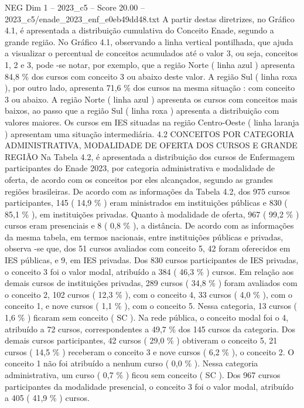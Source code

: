 \begin{textsample}{NEG Dim 1 – 2023\_c5 – Score 20.00 – 2023\_c5/enade\_2023\_enf\_e0eb49dd48.txt}
A partir destas diretrizes, no Gráfico 4.1, é apresentada a distribuição cumulativa do Conceito Enade, segundo a grande região.
No Gráfico 4.1, observando a linha vertical pontilhada, que ajuda a visualizar o percentual de conceitos acumulados até o valor 3, ou seja, conceitos 1, 2 e 3, pode -se notar, por exemplo, que a região Norte ( linha azul ) apresenta 84,8 \% dos cursos com conceito 3 ou abaixo deste valor.
A região Sul ( linha roxa ), por outro lado, apresenta 71,6 \% dos cursos na mesma situação : com conceito 3 ou abaixo.
A região Norte ( linha azul ) apresenta os cursos com conceitos mais baixos, ao passo que a região Sul ( linha roxa ) apresenta a distribuição com valores maiores.
Os cursos em IES situadas na região Centro-Oeste ( linha laranja ) apresentam uma situação intermediária. 4.2 CONCEITOS POR CATEGORIA ADMINISTRATIVA, MODALIDADE DE OFERTA DOS CURSOS E GRANDE REGIÃO Na Tabela 4.2, é apresentada a distribuição dos cursos de Enfermagem participantes do Enade 2023, por categoria administrativa e modalidade de oferta, de acordo com os conceitos por eles alcançados, segundo as grandes regiões brasileiras.
De acordo com as informações da Tabela 4.2, dos 975 cursos participantes, 145 ( 14,9 \% ) eram ministrados em instituições públicas e 830 ( 85,1 \% ), em instituições privadas.
Quanto à modalidade de oferta, 967 ( 99,2 \% ) cursos eram presenciais e 8 ( 0,8 \% ), a distância.
De acordo com as informações da mesma tabela, em termos nacionais, entre instituições públicas e privadas, observa -se que, dos 51 cursos avaliados com conceito 5, 42 foram oferecidos em IES públicas, e 9, em IES privadas.
Dos 830 cursos participantes de IES privadas, o conceito 3 foi o valor modal, atribuído a 384 ( 46,3 \% ) cursos.
Em relação aos demais cursos de instituições privadas, 289 cursos ( 34,8 \% ) foram avaliados com o conceito 2, 102 cursos ( 12,3 \% ), com o conceito 4, 33 cursos ( 4,0 \% ), com o conceito 1, e nove cursos ( 1,1 \% ), com o conceito 5.
Nessa categoria, 13 cursos ( 1,6 \% ) ficaram sem conceito ( SC ).
Na rede pública, o conceito modal foi o 4, atribuído a 72 cursos, correspondentes a 49,7 \% dos 145 cursos da categoria.
Dos demais cursos participantes, 42 cursos ( 29,0 \% ) obtiveram o conceito 5, 21 cursos ( 14,5 \% ) receberam o conceito 3 e nove cursos ( 6,2 \% ), o conceito 2.
O conceito 1 não foi atribuído a nenhum curso ( 0,0 \% ).
Nessa categoria administrativa, um curso ( 0,7 \% ) ficou sem conceito ( SC ).
Dos 967 cursos participantes da modalidade presencial, o conceito 3 foi o valor modal, atribuído a 405 ( 41,9 \% ) cursos.

\end{textsample}
